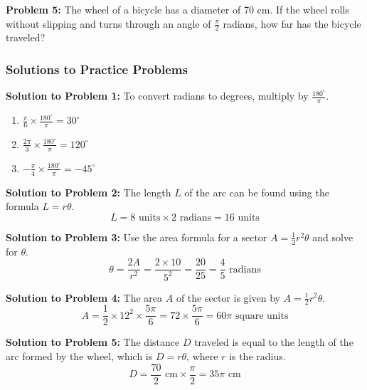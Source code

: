 \documentclass[a4paper,12pt]{book}
\begin{document}
\textbf{Problem 5:} The wheel of a bicycle has a diameter of 70 cm. If the wheel rolls without slipping and turns through an angle of \( \frac{\pi}{2} \) radians, how far has the bicycle traveled?

\subsubsection*{Solutions to Practice Problems}

\textbf{Solution to Problem 1:} To convert radians to degrees, multiply by \( \frac{180^\circ}{\pi} \).
\begin{enumerate}[label=\alph*.]
  \item \( \frac{\pi}{6} \times \frac{180^\circ}{\pi} = 30^\circ \)
  \item \( \frac{2\pi}{3} \times \frac{180^\circ}{\pi} = 120^\circ \)
  \item \( -\frac{\pi}{4} \times \frac{180^\circ}{\pi} = -45^\circ \)
\end{enumerate}

\textbf{Solution to Problem 2:} The length \( L \) of the arc can be found using the formula \( L = r\theta \).
\[ L = 8 \text{ units} \times 2 \text{ radians} = 16 \text{ units} \]

\textbf{Solution to Problem 3:} Use the area formula for a sector \( A = \frac{1}{2} r^2 \theta \) and solve for \( \theta \).
\[ \theta = \frac{2A}{r^2} = \frac{2 \times 10}{5^2} = \frac{20}{25} = \frac{4}{5} \text{ radians} \]

\textbf{Solution to Problem 4:} The area \( A \) of the sector is given by \( A = \frac{1}{2} r^2 \theta \).
\[ A = \frac{1}{2} \times 12^2 \times \frac{5\pi}{6} = 72 \times \frac{5\pi}{6} = 60\pi \text{ square units} \]

\textbf{Solution to Problem 5:} The distance \( D \) traveled is equal to the length of the arc formed by the wheel, which is \( D = r\theta \), where \( r \) is the radius.
\[ D = \frac{70}{2} \text{ cm} \times \frac{\pi}{2} = 35\pi \text{ cm} \]


\end{document}
